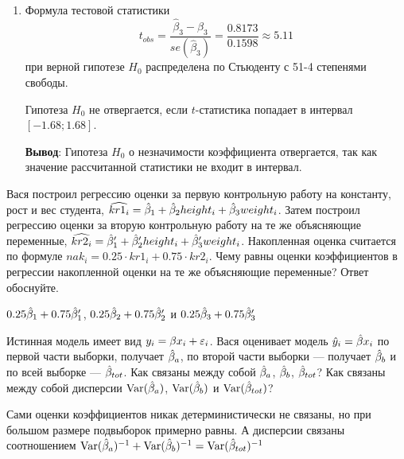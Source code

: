 \begin{problem}
\begin{sol}
\begin{enumerate}
    
    \item 
    Формула тестовой статистики 
\[
t_{obs} = \frac{\hat{\beta}_3-\beta_3}{se(\hat{\beta}_3)}= \frac{0.8173}{0.1598}\approx 5.11
\]
при верной гипотезе $H_0$ распределена по Стьюденту с 51-4 степенями свободы. 
    
Гипотеза $H_0$ не отвергается, если $t$-статистика попадает в интервал $[-1.68; 1.68]$.
    
    \textbf{Вывод}: Гипотеза $H_0$ о незначимости коэффициента отвергается, так как значение рассчитанной статистики не входит в интервал. 
\end{enumerate}
\end{sol}
\end{problem}




\begin{problem} %
Вася построил регрессию оценки за первую контрольную работу на константу, рост и вес студента, $\widehat{kr1_i}=\hat{\beta}_1 + \hat{\beta}_2 height_i + \hat{\beta}_3 weight_i$. Затем построил регрессию оценки за вторую контрольную работу на те же объясняющие переменные, $\widehat{kr2_i}=\hat{\beta}_1' + \hat{\beta}_2' height_i + \hat{\beta}_3' weight_i$. Накопленная оценка считается по формуле $nak_i=0.25 \cdot kr1_i + 0.75 \cdot kr2_i$. Чему равны оценки коэффициентов в регрессии накопленной оценки на те же объясняющие переменные? Ответ обоснуйте.

\begin{sol}
$0.25\hat{\beta}_1+0.75\hat{\beta}_1'$, $0.25\hat{\beta}_2+0.75\hat{\beta}_2'$ и $0.25\hat{\beta}_3+0.75\hat{\beta}_3'$
\end{sol}
\end{problem}


\begin{problem} %
Истинная модель имеет вид $y_i=\beta x_i +\varepsilon_i$. Вася оценивает модель $\hat{y}_i=\hat{\beta} x_i$ по первой части выборки, получает $\hat{\beta}_a$, по второй части выборки — получает $\hat{\beta}_b$ и по всей выборке — $\hat{\beta}_{tot}$. Как связаны между собой $\hat{\beta}_{a}$, $\hat{\beta}_{b}$, $\hat{\beta}_{tot}$? Как связаны между собой дисперсии $\operatorname{Var}(\hat{\beta}_a)$,  $\operatorname{Var}(\hat{\beta}_b)$ и  $\operatorname{Var}(\hat{\beta}_{tot})$?


\begin{sol}
Сами оценки коэффициентов никак детерминистически не связаны, но при большом размере подвыборок примерно равны. А дисперсии связаны соотношением $\operatorname{Var}(\hat{\beta}_a)^{-1}+\operatorname{Var}(\hat{\beta}_b)^{-1}=\operatorname{Var}(\hat{\beta}_{tot})^{-1}$
\end{sol}
\end{problem}



